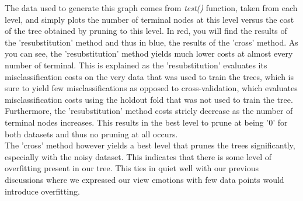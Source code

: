 \newpage

The data used to generate this graph comes from \emph{test()} function,
taken from each level, and simply plots the number of terminal nodes at this level versus
the cost of the tree obtained by pruning to this level.
In red, you will find the results of the 'resubstitution' method and thus in blue, the results of the 'cross' method.
As you can see, the 'resubstitution' method yields much lower costs at almost every number of terminal.
This is explained as the 'resubstitution' evaluates its misclassification costs on the very data that was used to train
the trees, which is sure to yield few misclassifications as opposed to cross-validation, which evaluates misclassification costs
using the holdout fold that was not used to train the tree.
Furthermore, the 'resubstitution' method costs stricly decrease as the number of terminal nodes increases.
This results in the best level to prune at being '0' for both datasets and thus no pruning at all occurs.\\
The 'cross' method however yields a best level that prunes the trees significantly, especially with the noisy dataset.
This indicates that there is some level of overfitting present in our tree. This ties in quiet well with our previous discussions
where we expressed our view emotions with few data points would introduce overfitting.
